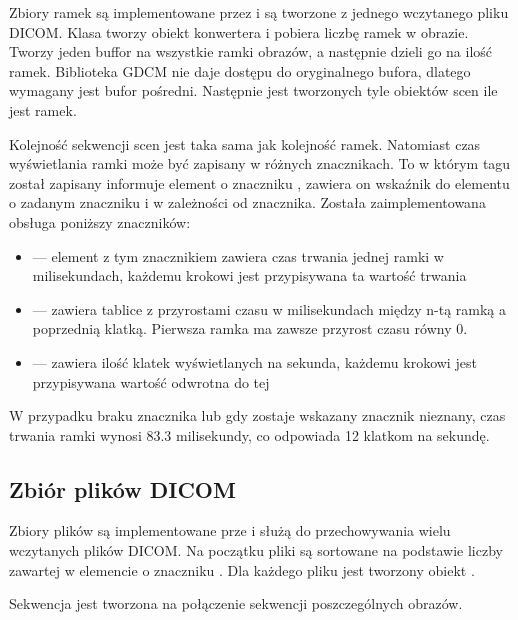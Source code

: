\par
Zbiory ramek są implementowane przez  i są tworzone z jednego wczytanego pliku DICOM.
Klasa tworzy obiekt konwertera i pobiera liczbę ramek w obrazie.
Tworzy jeden buffor na wszystkie ramki obrazów, a następnie dzieli go na ilość ramek.
Biblioteka GDCM nie daje dostępu do oryginalnego bufora, dlatego wymagany jest bufor pośredni.
Następnie jest tworzonych tyle obiektów scen ile jest ramek.
\par
Kolejność sekwencji scen jest taka sama jak kolejność ramek.
Natomiast czas wyświetlania ramki może być zapisany w różnych znacznikach.
To w którym tagu został zapisany informuje element o znaczniku , zawiera on wskaźnik do elementu o zadanym znaczniku i w zależności od znacznika.
Została zaimplementowana obsługa poniższy znaczników:
\begin{itemize}
    \item {} --- element z tym znacznikiem zawiera czas trwania jednej ramki w milisekundach, każdemu krokowi jest przypisywana ta wartość trwania

    \item {} --- zawiera tablice z przyrostami czasu w milisekundach między n-tą ramką a poprzednią klatką. Pierwsza ramka ma zawsze przyrost czasu równy 0.
    
    \item {} --- zawiera ilość klatek wyświetlanych na sekunda, każdemu krokowi jest przypisywana wartość odwrotna do tej
\end{itemize}
W przypadku braku znacznika lub gdy zostaje wskazany znacznik nieznany, czas trwania ramki wynosi $83.3$ milisekundy, co odpowiada 12 klatkom na sekundę.


\subsection{Zbiór plików DICOM}
\label{sec:sokar-dicomfileset}
\par
Zbiory plików są implementowane prze  i służą do przechowywania wielu wczytanych plików DICOM.
Na początku pliki są sortowane na podstawie liczby zawartej w elemencie o znaczniku .
Dla każdego pliku jest tworzony obiekt .
\par
Sekwencja jest tworzona na połączenie sekwencji poszczególnych obrazów.

